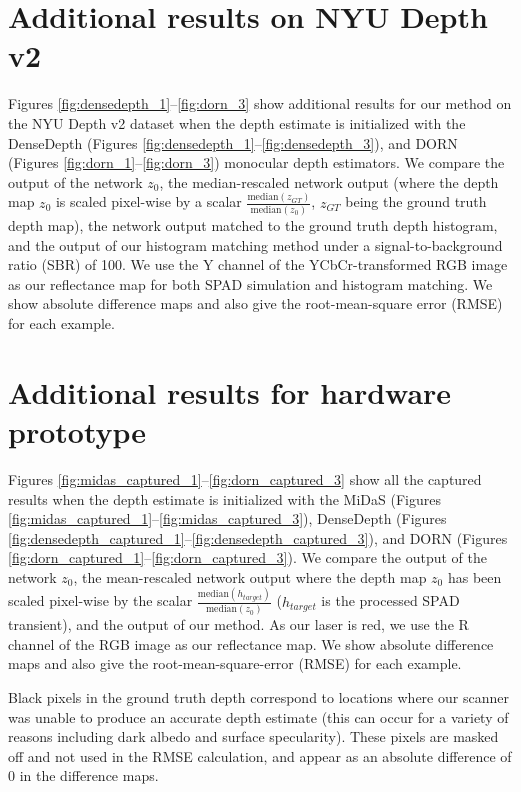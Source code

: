 \documentclass[10pt,letterpaper]{article}
\begin{document}
\section{Additional results on NYU Depth v2}
Figures \ref{fig:densedepth_1}--\ref{fig:dorn_3} show additional results
for our method on the NYU Depth v2 dataset when the depth estimate is
initialized with the DenseDepth \cite{Alhashim2018} (Figures
\ref{fig:densedepth_1}--\ref{fig:densedepth_3}), and DORN \cite{Fu2018} (Figures
\ref{fig:dorn_1}--\ref{fig:dorn_3}) monocular depth estimators.
We compare the output of the network $z_0$, the
median-rescaled network output (where the depth map $z_0$ is scaled pixel-wise by a
scalar $\frac{\text{median}(z_{GT})}{\text{median}(z_0)}$, $z_{GT}$ being the
ground truth depth map), the network output matched to the ground truth depth histogram, and the output of
our histogram matching method under a signal-to-background ratio (SBR) of 100.
We use the Y channel of the YCbCr-transformed RGB image as our reflectance map
for both SPAD simulation and histogram matching.
We show absolute difference maps and also give
the root-mean-square error (RMSE) for each example.


\section{Additional results for hardware prototype}
Figures \ref{fig:midas_captured_1}--\ref{fig:dorn_captured_3} show all the
captured results when the depth estimate is initialized with the MiDaS
\cite{Lasinger:2019} (Figures \ref{fig:midas_captured_1}--\ref{fig:midas_captured_3}),
DenseDepth (Figures \ref{fig:densedepth_captured_1}--\ref{fig:densedepth_captured_3}),
and DORN (Figures \ref{fig:dorn_captured_1}--\ref{fig:dorn_captured_3}). We compare
the output of the network $z_0$, the mean-rescaled network output where the
depth map $z_0$ has been scaled pixel-wise by the scalar
$\frac{\text{median}(h_{target})}{\text{median}(z_0)}$ ($h_{target}$ is the
processed SPAD transient), and the output of our method. As our laser is red, we
use the R channel of the RGB image as our reflectance map. We show absolute
difference maps and also give the root-mean-square-error (RMSE) for each
example.

Black pixels in the ground truth depth correspond to locations where our scanner
was unable to produce an accurate depth estimate (this can occur for a variety
of reasons including dark albedo and surface specularity). These pixels are masked off and not used in the RMSE
calculation, and appear as an absolute difference of 0 in the difference maps.


{\small


}
\end{document}
